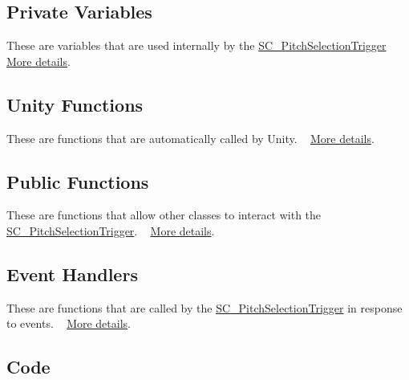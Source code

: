 \hypertarget{group___doc_s_c___p_s_t_DocSC_PSTPrivVar}{}\subsection{Private Variables}\label{group___doc_s_c___p_s_t_DocSC_PSTPrivVar}
These are variables that are used internally by the \hyperlink{class_s_c___pitch_selection_trigger}{S\+C\+\_\+\+Pitch\+Selection\+Trigger} ~\newline
 \hyperlink{group___s_c___p_s_t_priv_var}{More details}.\hypertarget{group___doc_s_c___p_s_t_DocSC_PSTUnity}{}\subsection{Unity Functions}\label{group___doc_s_c___p_s_t_DocSC_PSTUnity}
These are functions that are automatically called by Unity. ~\newline
 \hyperlink{group___s_c___p_s_t_unity}{More details}.\hypertarget{group___doc_s_c___p_s_t_DocSC_PSTPubFunc}{}\subsection{Public Functions}\label{group___doc_s_c___p_s_t_DocSC_PSTPubFunc}
These are functions that allow other classes to interact with the \hyperlink{class_s_c___pitch_selection_trigger}{S\+C\+\_\+\+Pitch\+Selection\+Trigger}. ~\newline
 \hyperlink{group___s_c___p_s_t_pub_func}{More details}.\hypertarget{group___doc_s_c___p_s_t_DocSC_PSTHandlers}{}\subsection{Event Handlers}\label{group___doc_s_c___p_s_t_DocSC_PSTHandlers}
These are functions that are called by the \hyperlink{class_s_c___pitch_selection_trigger}{S\+C\+\_\+\+Pitch\+Selection\+Trigger} in response to events. ~\newline
 \hyperlink{group___s_c___p_s_t_handlers}{More details}.\hypertarget{group___doc_s_c___p_s_t_DocSC_PSTCode}{}\subsection{Code}\label{group___doc_s_c___p_s_t_DocSC_PSTCode}

